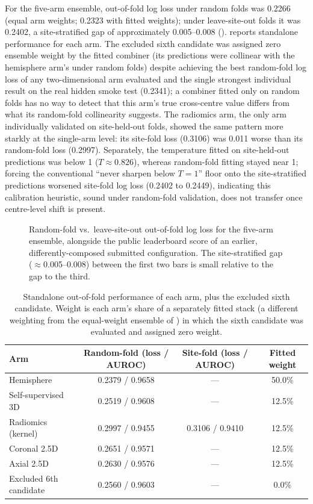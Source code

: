\documentclass[11pt]{article}
\begin{document}
For the five-arm ensemble, out-of-fold log loss under random folds was 0.2266 (equal arm weights; 0.2323 with fitted weights); under leave-site-out folds it was 0.2402, a site-stratified gap of approximately 0.005--0.008 ().  reports standalone performance for each arm. The excluded sixth candidate was assigned zero ensemble weight by the fitted combiner (its predictions were collinear with the hemisphere arm's under random folds) despite achieving the best random-fold log loss of any two-dimensional arm evaluated and the single strongest individual result on the real hidden smoke test (0.2341); a combiner fitted only on random folds has no way to detect that this arm's true cross-centre value differs from what its random-fold collinearity suggests. The radiomics arm, the only arm individually validated on site-held-out folds, showed the same pattern more starkly at the single-arm level: its site-fold loss (0.3106) was 0.011 worse than its random-fold loss (0.2997). Separately, the temperature fitted on site-held-out predictions was below 1 ($T \approx 0.826$), whereas random-fold fitting stayed near 1; forcing the conventional ``never sharpen below $T=1$'' floor onto the site-stratified predictions worsened site-fold log loss (0.2402 to 0.2449), indicating this calibration heuristic, sound under random-fold validation, does not transfer once centre-level shift is present.

\begin{figure}[h]
\centering

\caption{Random-fold vs.\ leave-site-out out-of-fold log loss for the five-arm ensemble, alongside the public leaderboard score of an earlier, differently-composed submitted configuration. The site-stratified gap ($\approx$0.005--0.008) between the first two bars is small relative to the gap to the third.}
\label{fig:shiftgap}
\end{figure}

\begin{table}[h]
\centering
\small
\caption{Standalone out-of-fold performance of each arm, plus the excluded sixth candidate. Weight is each arm's share of a separately fitted stack (a different weighting from the equal-weight ensemble of ) in which the sixth candidate was evaluated and assigned zero weight.}
\label{tab:arms}
\begin{tabular}{@{}lccc@{}}
\toprule
\textbf{Arm} & \textbf{Random-fold (loss / AUROC)} & \textbf{Site-fold (loss / AUROC)} & \textbf{Fitted weight} \\
\midrule
Hemisphere & 0.2379 / 0.9658 & --- & 50.0\% \\
Self-supervised 3D & 0.2519 / 0.9608 & --- & 12.5\% \\
Radiomics (kernel) & 0.2997 / 0.9455 & 0.3106 / 0.9410 & 12.5\% \\
Coronal 2.5D & 0.2651 / 0.9571 & --- & 12.5\% \\
Axial 2.5D & 0.2630 / 0.9576 & --- & 12.5\% \\
\midrule
Excluded 6th candidate & 0.2560 / 0.9603 & --- & 0.0\% \\
\bottomrule
\end{tabular}
\end{table}
\end{document}
